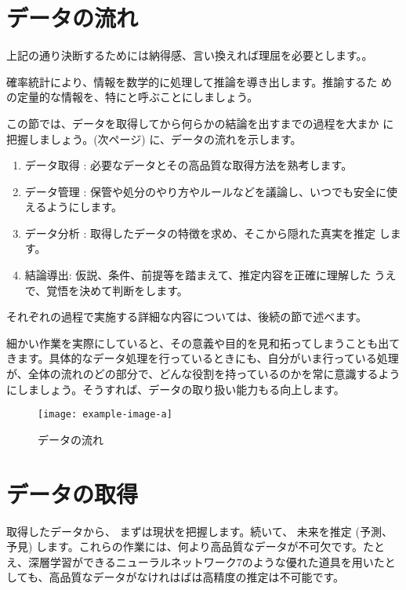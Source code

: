 

\section{データの流れ}
上記の通り決断するためには納得感、言い換えれば理屈を必要とします。。

確率統計により、情報を数学的に処理して推論を導き出します。推諭するた
めの定量的な情報を、特にと呼ぶことにしましょう。

この節では、データを取得してから何らかの結論を出すまでの過程を大まか
に把握しましょう。{}(次ページ) に、データの流れを示します。

\begin{enumerate}[label=\protect\circled{\arabic*}]
    \item データ取得 : 必要なデータとその高品質な取得方法を熟考します。
    \item データ管理 : 保管や処分のやり方やルールなどを議論し、いつでも安全に使えるようにします。
    \item データ分析 : 取得したデータの特徴を求め、そこから隠れた真実を推定
    します。  
    \item 結論導出: 仮説、条件、前提等を踏まえて、推定内容を正確に理解した
    うえで、覚悟を決めて判断をします。
\end{enumerate}

それぞれの過程で実施する詳細な内容については、後続の節で述べます。

細かい作業を実際にしていると、その意義や目的を見和拓ってしまうことも出てきます。具体的なデータ処理を行っているときにも、自分がいま行っている処理が、全体の流れのどの部分で、どんな役割を持っているのかを常に意識するようにしましょう。そうすれば、データの取り扱い能力もる向上します。

\begin{figure}[ht]
    \texttt{[image: example-image-a]}
    \caption{データの流れ\label{fig:flow}}
\end{figure}


\section{データの取得}
取得したデータから、 まずは現状を把握します。続いて、 未来を推定 (予測、予見) します。これらの作業には、何より高品質なデータが不可欠です。たとえ、深層学習ができるニューラルネットワーク7のような優れた道具を用いたとしても、高品質なデータがなけれはばは高精度の推定は不可能です。

